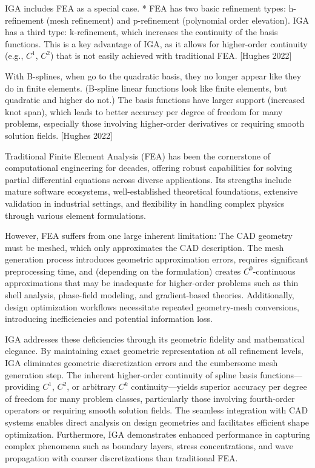 \documentclass[12pt,report,justified]{SANDreport}
\begin{document}
IGA includes FEA as a special case.
* FEA has two basic refinement types: h-refinement (mesh refinement) and p-refinement (polynomial order elevation).  IGA has a third type: k-refinement, which increases the continuity of the basis functions.  This is a key advantage of IGA, as it allows for higher-order continuity (e.g., $C^1$, $C^2$) that is not easily achieved with traditional FEA.
[Hughes 2022]

With B-splines, when go to the quadratic basis, they no longer appear like they do in finite elements.  (B-spline linear functions look like finite elements, but quadratic and higher do not.)  The basis functions have larger support (increased knot span), which leads to better accuracy per degree of freedom for many problems, especially those involving higher-order derivatives or requiring smooth solution fields. [Hughes 2022]

Traditional Finite Element Analysis (FEA) has been the cornerstone of computational engineering for decades, offering robust capabilities for solving partial differential equations across diverse applications. Its strengths include mature software ecosystems, well-established theoretical foundations, extensive validation in industrial settings, and flexibility in handling complex physics through various element formulations. 

However, FEA suffers from one large inherent limitation:  The CAD geometry must be meshed, which only approximates the CAD description.  The mesh generation process introduces geometric approximation errors, requires significant preprocessing time, and (depending on the formulation) creates $C^0$-continuous approximations that may be inadequate for higher-order problems such as thin shell analysis, phase-field modeling, and gradient-based theories. Additionally, design optimization workflows necessitate repeated geometry-mesh conversions, introducing inefficiencies and potential information loss.

IGA addresses these deficiencies through its geometric fidelity and mathematical elegance. By maintaining exact geometric representation at all refinement levels, IGA eliminates geometric discretization errors and the cumbersome mesh generation step. The inherent higher-order continuity of spline basis functions—providing $C^1$, $C^2$, or arbitrary $C^k$ continuity—yields superior accuracy per degree of freedom for many problem classes, particularly those involving fourth-order operators or requiring smooth solution fields. The seamless integration with CAD systems enables direct analysis on design geometries and facilitates efficient shape optimization. Furthermore, IGA demonstrates enhanced performance in capturing complex phenomena such as boundary layers, stress concentrations, and wave propagation with coarser discretizations than traditional FEA.
\end{document}
